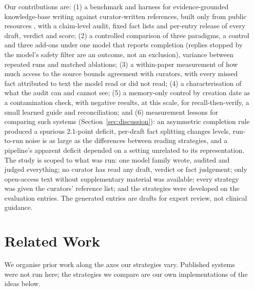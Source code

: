 \documentclass{article} %
\begin{document}
Our contributions are: (1) a benchmark and harness for evidence-grounded knowledge-base writing against curator-written references, built only from public resources \citep{sayers2026database,Louden2020MedgenNcbis,rosonovski2024europe,seal2023genenames}, with a claim-level audit, fixed fact lists and per-entry release of every draft, verdict and score; (2) a controlled comparison of three paradigms, a control and three add-ons under one model that reports completion (replies stopped by the model's safety filter are an outcome, not an exclusion), variance between repeated runs and matched ablations; (3) a within-paper measurement of how much access to the source bounds agreement with curators, with every missed fact attributed to text the model read or did not read; (4) a characterisation of what the audit can and cannot see; (5) a memory-only control by creation date as a contamination check, with negative results, at this scale, for recall-then-verify, a small learned guide and reconciliation; and (6) measurement lessons for comparing such systems (Section~\ref{sec:discussion}): an asymmetric completion rule produced a spurious 2.1-point deficit, per-draft fact splitting changes levels, run-to-run noise is as large as the differences between reading strategies, and a pipeline's apparent deficit depended on a setting unrelated to its representation. The study is scoped to what was run: one model family wrote, audited and judged everything; no curator has read any draft, verdict or fact judgement; only open-access text without supplementary material was available; every strategy was given the curators' reference list; and the strategies were developed on the evaluation entries. The generated entries are drafts for expert review, not clinical guidance.

\section{Related Work}
\label{sec:related_work}
We organise prior work along the axes our strategies vary. Published systems were not run here; the strategies we compare are our own implementations of the ideas below.
\end{document}
